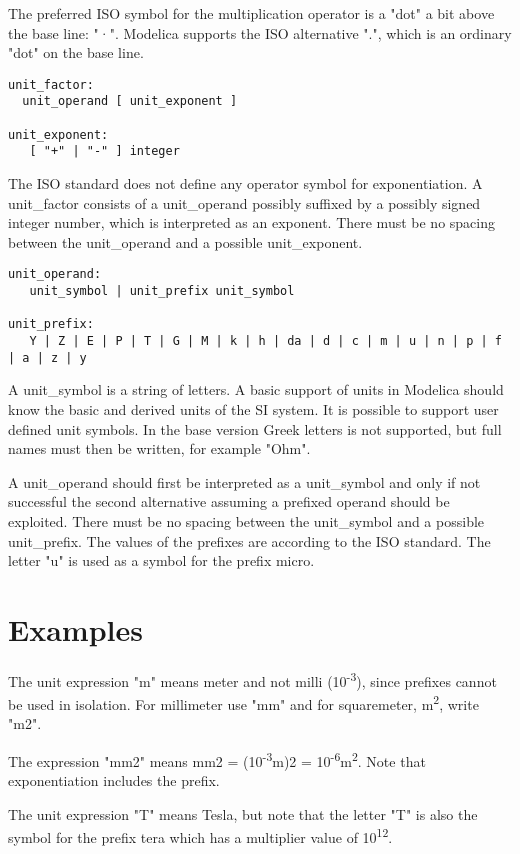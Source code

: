 The preferred ISO symbol for the multiplication operator is a "dot" a
bit above the base line: "·". Modelica supports the ISO alternative ".",
which is an ordinary "dot" on the base line.

\begin{lstlisting}[language=grammar]
unit_factor:
  unit_operand [ unit_exponent ]

unit_exponent:
   [ "+" | "-" ] integer
\end{lstlisting}

The ISO standard does not define any operator symbol for exponentiation.
A unit\_factor consists of a unit\_operand possibly suffixed by a
possibly signed integer number, which is interpreted as an exponent.
There must be no spacing between the unit\_operand and a possible
unit\_exponent.

\begin{lstlisting}[language=grammar]
unit_operand:
   unit_symbol | unit_prefix unit_symbol

unit_prefix:
   Y | Z | E | P | T | G | M | k | h | da | d | c | m | u | n | p | f | a | z | y
\end{lstlisting}

A unit\_symbol is a string of letters. A basic support of units in
Modelica should know the basic and derived units of the SI system. It is
possible to support user defined unit symbols. In the base version Greek
letters is not supported, but full names must then be written, for
example "Ohm".

A unit\_operand should first be interpreted as a unit\_symbol and only
if not successful the second alternative assuming a prefixed operand
should be exploited. There must be no spacing between the unit\_symbol
and a possible unit\_prefix. The values of the prefixes are according to
the ISO standard. The letter "u" is used as a symbol for the prefix
micro.

\section{Examples}

The unit expression "m" means meter and not milli
(10\textsuperscript{-3}), since prefixes cannot be used in isolation.
For millimeter use "mm" and for squaremeter, m\textsuperscript{2}, write
"m2".

The expression "mm2" means mm2 = (10\textsuperscript{-3}m)2 =
10\textsuperscript{-6}m\textsuperscript{2}. Note that exponentiation
includes the prefix.

The unit expression "T" means Tesla, but note that the letter "T" is
also the symbol for the prefix tera which has a multiplier value of
10\textsuperscript{12}.

